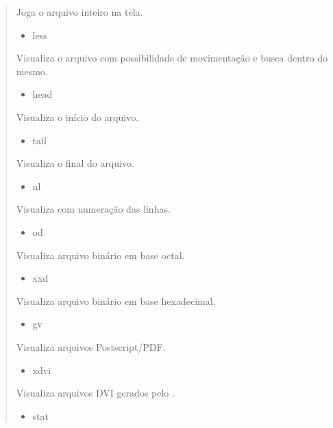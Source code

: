\documentclass[a4paper,10pt,brazil]{sphinxmanual}
\begin{document}
\begin{quote}
\begin{description}
\begin{itemize}
\end{itemize}

Joga o arquivo inteiro na tela.
\begin{itemize}
\item {} 
less

\end{itemize}

Visualiza o arquivo com possibilidade de movimentação e busca
dentro do mesmo.
\begin{itemize}
\item {} 
head

\end{itemize}

Visualiza o início do arquivo.
\begin{itemize}
\item {} 
tail

\end{itemize}

Visualiza o final do arquivo.
\begin{itemize}
\item {} 
nl

\end{itemize}

Visualiza com numeração das linhas.
\begin{itemize}
\item {} 
od

\end{itemize}

Visualiza arquivo binário em base octal.
\begin{itemize}
\item {} 
xxd

\end{itemize}

Visualiza arquivo binário em base hexadecimal.
\begin{itemize}
\item {} 
gv

\end{itemize}

Visualiza arquivos Postscript/PDF.
\begin{itemize}
\item {} 
xdvi

\end{itemize}

Visualiza arquivos DVI gerados pelo .
\begin{itemize}
\item {} 
stat

\end{itemize}


\end{description}
\end{quote}
\end{document}
